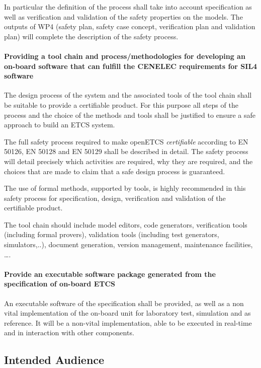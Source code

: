 \documentclass{template/openetcs_article}
\begin{document}
In particular the definition of the process shall take into account specification as well as verification and validation of the safety properties on the models. The outputs of WP4 (safety plan, safety case concept, verification plan and validation plan) will complete the description of the safety process.


\paragraph{Providing a tool chain and process/methodologies for developing
an on-board software that can fulfill the CENELEC requirements for SIL4 software}

The design process of the system and the associated tools of the tool chain shall be suitable to provide a certifiable product. For this purpose all steps of the process and the choice of the methods and tools shall be justified to ensure a safe approach to build an ETCS system.

The full safety process required to make openETCS \emph{certifiable} according to EN 50126, EN 50128 and EN 50129 shall be described in detail. The safety process will detail precisely which activities are required, why they are required, and the choices that are made to claim that a safe design process is guaranteed.

The use of formal methods, supported by tools, is highly recommended in this safety process for specification, design, verification and validation of the certifiable product.

The tool chain should include model editors, code generators, verification tools (including formal provers), validation tools (including test generators, simulators,..), document generation, version management, maintenance facilities, \dots .

\paragraph{Provide an executable software package generated from the specification of on-board ETCS}

An executable software of the specification shall be provided, as well as a non vital implementation of the on-board unit for laboratory test, simulation and as reference. It will be a non-vital  implementation, able to be executed in real-time and in interaction with other components.


\subsection{Intended Audience}
\end{document}
